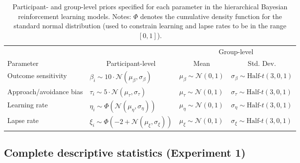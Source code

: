 \documentclass[a4paper,12pt]{article}
\begin{document}
\begin{refsection}[supp]
\begin{table}[h!]
    \centering
    \begin{tabular}{llll}
        \toprule
                  &                   & \multicolumn{2}{c}{Group-level} \\
        \cmidrule(lr){3-4}
        Parameter & \multicolumn{1}{c}{Participant-level} & \multicolumn{1}{c}{Mean} & \multicolumn{1}{c}{Std. Dev.} \\
        \midrule
        Outcome sensitivity & $\beta_i \sim 10 \cdot \mathcal{N}(\mu_\beta, \sigma_\beta)$ & $\mu_\beta \sim \mathcal{N}(0,1)$ & $\sigma_\beta \sim \text{Half-}t(3,0,1)$ \\ 
        Approach/avoidance bias & $\tau_i \sim 5 \cdot \mathcal{N}(\mu_\tau, \sigma_\tau)$ & $\mu_\tau \sim \mathcal{N}(0,1)$ & $\sigma_\tau \sim \text{Half-}t(3,0,1)$ \\ 
        Learning rate & $\eta_i \sim \Phi \left(\mathcal{N}(\mu_\eta, \sigma_\eta)\right)$ & $\mu_\eta \sim \mathcal{N}(0,1)$ & $\sigma_\eta \sim \text{Half-}t(3,0,1)$ \\ 
        Lapse rate & $\xi_i \sim \Phi \left(-2 + \mathcal{N}(\mu_\xi, \sigma_\xi)\right)$ & $\mu_\xi \sim \mathcal{N}(0,1)$ & $\sigma_\xi \sim \text{Half-}t(3,0,1)$ \\ 
        \bottomrule
    \end{tabular}
    \caption{Participant- and group-level priors specified for each parameter in the hierarchical Bayesian reinforcement learning models. Notes: $\Phi$ denotes the cumulative density function for the standard normal distribution (used to constrain learning and lapse rates to be in the range $[0,1]$).}
    \label{tab:priors}
\end{table}

\clearpage
\subsection*{Complete descriptive statistics (Experiment 1)}


\end{refsection}
\end{document}
